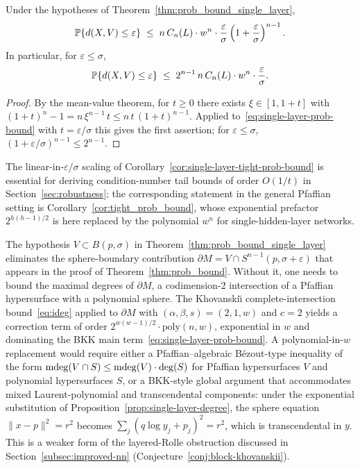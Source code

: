 \begin{corollary}\label{cor:single-layer-tight-prob-bound}
  Under the hypotheses of Theorem~\ref{thm:prob_bound_single_layer},
  \begin{equation*}
    \operatorname*{\mathbb{P}}\{d(X,V)\le\varepsilon\}
    \;\leq\; n\,C_n(L)\cdot w^n\cdot\frac{\varepsilon}{\sigma}\left(1+\frac{\varepsilon}{\sigma}\right)^{n-1}.
  \end{equation*}
  In particular, for $\varepsilon\le\sigma$,
  \begin{equation*}
    \operatorname*{\mathbb{P}}\{d(X,V)\le\varepsilon\} \;\leq\; 2^{n-1}\,n\,C_n(L)\cdot w^n\cdot\frac{\varepsilon}{\sigma}.
  \end{equation*}
\end{corollary}

\begin{proof}
  By the mean-value theorem, for $t\ge 0$ there exists $\xi\in[1,1+t]$ with $(1+t)^n - 1 = n\,\xi^{n-1}\,t \le n\,t\,(1+t)^{n-1}$. Applied to~\eqref{eq:single-layer-prob-bound} with $t=\varepsilon/\sigma$ this gives the first assertion; for $\varepsilon\le\sigma$, $(1+\varepsilon/\sigma)^{n-1}\le 2^{n-1}$.
\end{proof}

The linear-in-$\varepsilon/\sigma$ scaling of Corollary~\ref{cor:single-layer-tight-prob-bound} is essential for deriving condition-number tail bounds of order $O(1/t)$ in Section~\ref{sec:robustness}; the corresponding statement in the general Pfaffian setting is Corollary~\ref{cor:tight_prob_bound}, whose exponential prefactor $2^{h(h-1)/2}$ is here replaced by the polynomial $w^n$ for single-hidden-layer networks.

\begin{remark}\label{rem:sphere-obstruction}
  The hypothesis $V\subset B(p,\sigma)$ in Theorem~\ref{thm:prob_bound_single_layer} eliminates the sphere-boundary contribution $\partial M = V\cap S^{n-1}(p,\sigma+\varepsilon)$ that appears in the proof of Theorem~\ref{thm:prob_bound}. Without it, one needs to bound the maximal degrees of $\partial M$, a codimension-$2$ intersection of a Pfaffian hypersurface with a polynomial sphere. The Khovanski\u\i{} complete-intersection bound~\eqref{eq:ideg} applied to $\partial M$ with $(\alpha,\beta,s)=(2,1,w)$ and $c=2$ yields a correction term of order $2^{w(w-1)/2}\cdot\mathrm{poly}(n,w)$, exponential in $w$ and dominating the BKK main term~\eqref{eq:single-layer-prob-bound}. A polynomial-in-$w$ replacement would require either a Pfaffian--algebraic B\'ezout-type inequality of the form $\operatorname{\mathrm{mdeg}}(V\cap S)\le\operatorname{\mathrm{mdeg}}(V)\cdot\deg(S)$ for Pfaffian hypersurfaces $V$ and polynomial hypersurfaces $S$, or a BKK-style global argument that accommodates mixed Laurent-polynomial and transcendental components: under the exponential substitution of Proposition~\ref{prop:single-layer-degree}, the sphere equation $\|x-p\|^2=r^2$ becomes $\sum_j(q\log y_j+p_j)^2=r^2$, which is transcendental in $y$. This is a weaker form of the layered-Rolle obstruction discussed in Section~\ref{subsec:improved-nn} (Conjecture~\ref{conj:block-khovanskii}).
\end{remark}
